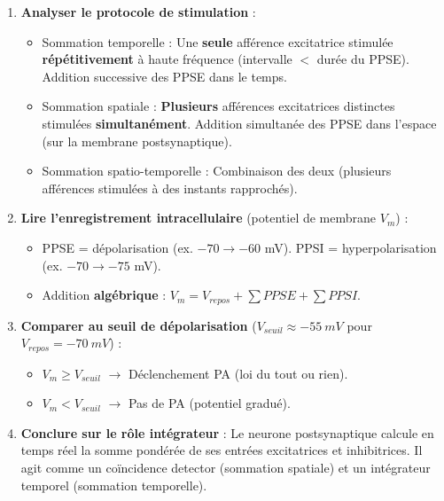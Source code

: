 \documentclass[11pt]{article}
\newcommand{\cle}[1]{{\popxbold\color{popdark}#1}}
\begin{document}
\begin{methode}
\begin{enumerate}
\item \textbf{Analyser le protocole de stimulation} :
\begin{itemize}
\item \cle{Sommation temporelle} : Une \textbf{seule} afférence excitatrice stimulée \textbf{répétitivement} à haute fréquence (intervalle $<$ durée du PPSE). Addition successive des PPSE dans le temps.
\item \cle{Sommation spatiale} : \textbf{Plusieurs} afférences excitatrices distinctes stimulées \textbf{simultanément}. Addition simultanée des PPSE dans l'espace (sur la membrane postsynaptique).
\item \cle{Sommation spatio-temporelle} : Combinaison des deux (plusieurs afférences stimulées à des instants rapprochés).
\end{itemize}
\item \textbf{Lire l'enregistrement intracellulaire} (potentiel de membrane $V_m$) :
\begin{itemize}
\item PPSE = dépolarisation (ex. $-70 \rightarrow -60$ mV). PPSI = hyperpolarisation (ex. $-70 \rightarrow -75$ mV).
\item Addition \textbf{algébrique} : $V_m = V_{repos} + \sum PPSE + \sum PPSI$.
\end{itemize}
\item \textbf{Comparer au seuil de dépolarisation} ($V_{seuil} \approx \SI{-55}{mV}$ pour $V_{repos} = \SI{-70}{mV}$) :
\begin{itemize}
\item $V_m \ge V_{seuil}$ $\rightarrow$ Déclenchement PA (loi du tout ou rien).
\item $V_m < V_{seuil}$ $\rightarrow$ Pas de PA (potentiel gradué).
\end{itemize}
\item \textbf{Conclure sur le rôle intégrateur} : Le neurone postsynaptique calcule en temps réel la somme pondérée de ses entrées excitatrices et inhibitrices. Il agit comme un \cle{coïncidence detector} (sommation spatiale) et un \cle{intégrateur temporel} (sommation temporelle).
\end{enumerate}
\end{methode}
\end{document}
